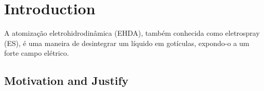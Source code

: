 \chapter{Introduction}
\label{chap:intro} %

A atomização eletrohidrodinâmica (EHDA), também conhecida como eletrospray (ES), é uma maneira de desintegrar um líquido
em gotículas, expondo-o a um forte campo elétrico. 






\section{Motivation and Justify}
\label{sec:motivacao}

